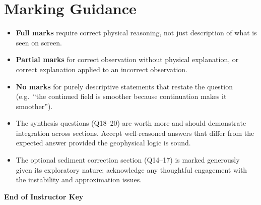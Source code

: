 \documentclass[11pt]{article}
\begin{document}
\section*{Marking Guidance}

\begin{itemize}
  \item \textbf{Full marks} require correct physical reasoning, not just
        description of what is seen on screen.
  \item \textbf{Partial marks} for correct observation without physical
        explanation, or correct explanation applied to an incorrect observation.
  \item \textbf{No marks} for purely descriptive statements that restate the
        question (e.g.\ ``the continued field is smoother because continuation
        makes it smoother'').
  \item The synthesis questions (Q18--20) are worth more and should demonstrate
        integration across sections.  Accept well-reasoned answers that differ
        from the expected answer provided the geophysical logic is sound.
  \item The optional sediment correction section (Q14--17) is marked generously
        given its exploratory nature; acknowledge any thoughtful engagement with
        the instability and approximation issues.
\end{itemize}

\vspace{1em}
\noindent\textbf{End of Instructor Key}
\end{document}

